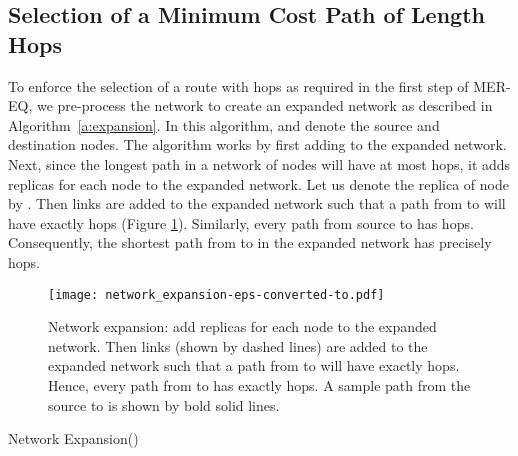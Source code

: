 \documentclass[10pt,journal]{IEEEtran}
\theoremstyle{definition}
\begin{document}
\subsection{Selection of a Minimum Cost Path of Length  Hops }
To enforce the selection of a route with  hops as required in the first step of MER-EQ, we pre-process the network to create an expanded network as described in Algorithm~\ref{a:expansion}. In this algorithm,  and  denote the source and destination nodes. The algorithm works by first adding  to the expanded network. Next, since the longest path in a network of  nodes will have at most  hops,  it adds  replicas for each node  to the expanded network.
Let us denote the  replica of node  by .  Then links are added to the expanded network such that a path from  to  will have exactly  hops (Figure \ref{fig:network_expansion}). 
Similarly, every path from source  to  has  hops.
Consequently, the shortest path from  to  in the expanded network has  precisely  hops.
\begin{figure}
\begin{center}
	\texttt{[image: network\_expansion-eps-converted-to.pdf]}
 \end{center}
 \caption{Network expansion:   add  replicas for each node  to the expanded network. Then links (shown by dashed lines) are added to the expanded network such that a path from  to  will have exactly  hops. Hence, every path from  to  has exactly  hops. A sample path from the source to  is shown by bold solid lines. }
 \label{fig:network_expansion}
 \end{figure}

\begin{algorithm}[t]
\caption{Network Expansion()}
\renewcommand{\algorithmiccomment}[1]{/*~#1~*/}
\begin{algorithmic}[1]
    \STATE 
    \STATE 
    \STATE{}
    \FORALL{}
        \STATE 
    \ENDFOR
     
    \STATE{}
    \FORALL{}
        \STATE 
    \ENDFOR
    \STATE{}
    \FORALL{}
        \FOR{ \TO }
            \STATE 
        \ENDFOR
    \ENDFOR
    \RETURN 
\end{algorithmic}
\label{a:expansion}
\end{algorithm}
\end{document}
